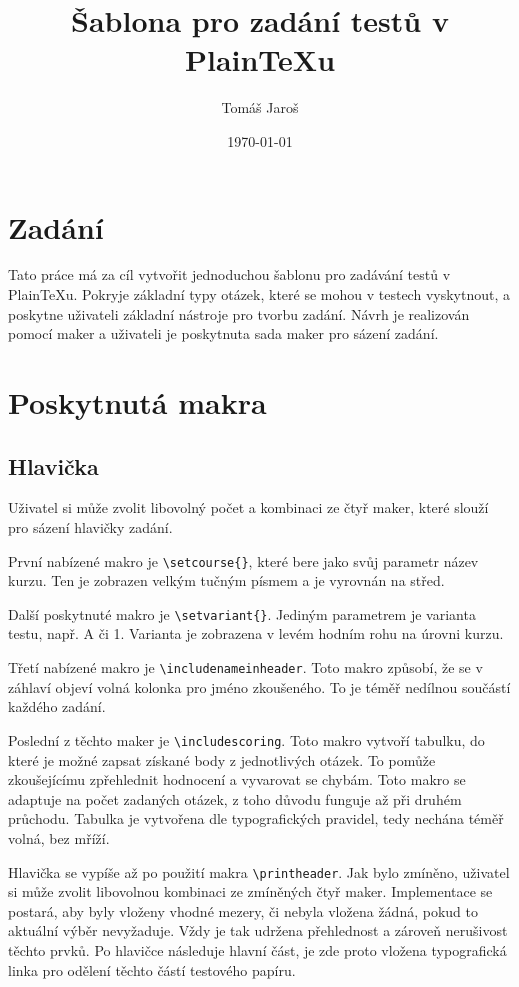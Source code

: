 \documentclass{article}
\title{Šablona pro zadání testů v Plain\TeX{}u}
\author{Tomáš Jaroš}
\date{\today}
\begin{document}
\maketitle
\tableofcontents
\newpage

\section{Zadání}
    Tato práce má za cíl vytvořit jednoduchou šablonu pro zadávání testů v Plain\TeX{}u. Pokryje základní typy otázek, které se mohou v testech
    vyskytnout, a poskytne uživateli základní nástroje pro tvorbu zadání. Návrh je realizován pomocí maker a uživateli je poskytnuta
    sada maker pro sázení zadání.

\section{Poskytnutá makra}
\subsection{Hlavička}
    Uživatel si může zvolit libovolný počet a kombinaci ze čtyř maker, které slouží pro sázení hlavičky zadání.

    První nabízené makro je \texttt{\textbackslash setcourse\{\}}, které bere jako svůj parametr
    název kurzu. Ten je zobrazen velkým tučným písmem a je vyrovnán na střed.

    Další poskytnuté makro je \texttt{\textbackslash setvariant\{\}}. Jediným parametrem
    je varianta testu, např. A či 1. Varianta je zobrazena v levém hodním rohu na úrovni kurzu.

    Třetí nabízené makro je \texttt{\textbackslash includenameinheader}. Toto makro způsobí,
    že se v záhlaví objeví volná kolonka pro jméno zkoušeného. To je téměř nedílnou součástí
    každého zadání.

    Poslední z těchto maker je \texttt{\textbackslash includescoring}. Toto makro vytvoří tabulku,
    do které je možné zapsat získané body z jednotlivých otázek. To pomůže zkoušejícímu zpřehlednit
    hodnocení a vyvarovat se chybám. Toto makro se adaptuje na počet zadaných otázek, z toho důvodu
    funguje až při druhém průchodu. Tabulka je vytvořena dle typografických pravidel, tedy
    nechána téměř volná, bez mříží.

    Hlavička se vypíše až po použití makra \texttt{\textbackslash printheader}. Jak bylo zmíněno, uživatel
    si může zvolit libovolnou kombinaci ze zmíněných čtyř maker. Implementace se postará,
    aby byly vloženy vhodné mezery, či nebyla vložena žádná, pokud to aktuální výběr nevyžaduje.
    Vždy je tak udržena přehlednost a zároveň nerušivost těchto prvků.
    Po hlavičce následuje hlavní část, je zde proto vložena typografická linka pro odělení těchto
    částí testového papíru.
\end{document}
